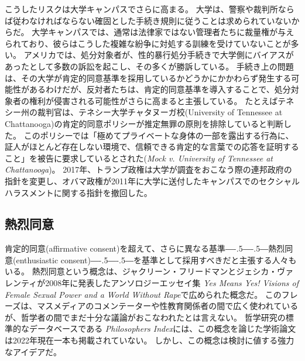 \documentclass[paper=a4,book,openany]{jlreq}
\newcommand{\ig}[1]{}           %
\def\DDASH{―\kern-.5\zw―\kern-.5\zw―} %
\begin{document}
こうしたリスクは大学キャンパスでさらに高まる。
大学は、警察や裁判所ならば従わなければならない確固とした手続き規則に従うことは求められていないからだ。
大学キャンパスでは、通常は法律家ではない管理者たちに裁量権が与えられており、彼らはこうした複雑な紛争に対処する訓練を受けていないことが多い。
アメリカでは、処分対象者が、性的暴行処分手続きで大学側にバイアスがあったとして多数の訴訟を起こし、その多くが勝訴している\citep{anderson19:_more_title_ix_lawsuit_accus_accus}。
手続き上の問題は、その大学が肯定的同意基準を採用しているかどうかにかかわらず発生する可能性があるわけだが、反対者たちは、肯定的同意基準を導入することで、処分対象者の権利が侵害される可能性がさらに高まると主張している。
たとえばテネシー州の裁判官は、テネシー大学チャタヌーガ校(University of Tennessee at Chattanooga)の肯定的同意ポリシーが推定無罪の原則を排除していると判断した。
このポリシーでは「極めてプライベートな身体の一部を露出する行為に、証人がほとんど存在しない環境で、信頼できる肯定的な言葉での応答を証明すること」を被告に要求しているとされた(\emph{Mock v. University of Tennessee at Chattanooga}\ig{, No. 14-1687-II, Tenn. Ch. Ct. 10 August 2015\footnote{\url{https://kcjohnson.files.wordpress.com/2013/08/memorandum-mock.pdf}.}})。
2017年、トランプ政権は大学が調査をおこなう際の連邦政府の指針を変更し、オバマ政権が2011年に大学に送付したキャンパスでのセクシャルハラスメントに関する指針を撤回した。

\subsection{熱烈同意}

肯定的同意(affirmative consent)を超えて、さらに異なる基準{\DDASH}熱烈同意(enthusiastic consent){\DDASH}を基準として採用すべきだと主張する人々もいる。
熱烈同意という概念は、ジャクリーン・フリードマン\ig{Jaclyn Friedman}とジェシカ・ヴァレンティ\ig{Jessica Valenti}が2008年に発表したアンソロジーエッセイ集 \emph{Yes Means Yes! Visions of Female Sexual Power and a World Without Rape}で広められた概念だ\citep[pp. 308--309]{friedman08:_yes_means_yes}。
このフレーズは、マスメディアのコメンテーターや性教育関係者の間で広く使われているが、哲学者の間でまだ十分な議論がおこなわれたとは言えない。
哲学研究の標準的なデータベースである \emph{Philosophers Index}には、この概念を論じた学術論文は2022年現在一本も掲載されていない。
しかし、この概念は検討に値する強力なアイデアだ。
\end{document}
